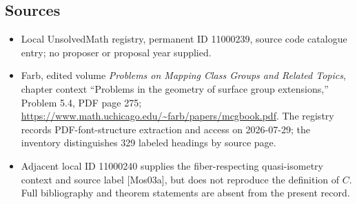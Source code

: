 \documentclass[11pt]{article}
\begin{document}
\subsection{Sources}
\begin{itemize}
\item Local UnsolvedMath registry, permanent ID 11000239, source code catalogue entry; no proposer or proposal year supplied.
\item Farb, edited volume \emph{Problems on Mapping Class Groups and Related Topics}, chapter context ``Problems in the geometry of surface group extensions,'' Problem 5.4, PDF page 275; \url{https://www.math.uchicago.edu/~farb/papers/mcgbook.pdf}. The registry records PDF-font-structure extraction and access on 2026-07-29; the inventory distinguishes 329 labeled headings by source page.
\item Adjacent local ID 11000240 supplies the fiber-respecting quasi-isometry context and source label [Mos03a], but does not reproduce the definition of $C$. Full bibliography and theorem statements are absent from the present record.
\end{itemize}
\end{document}
